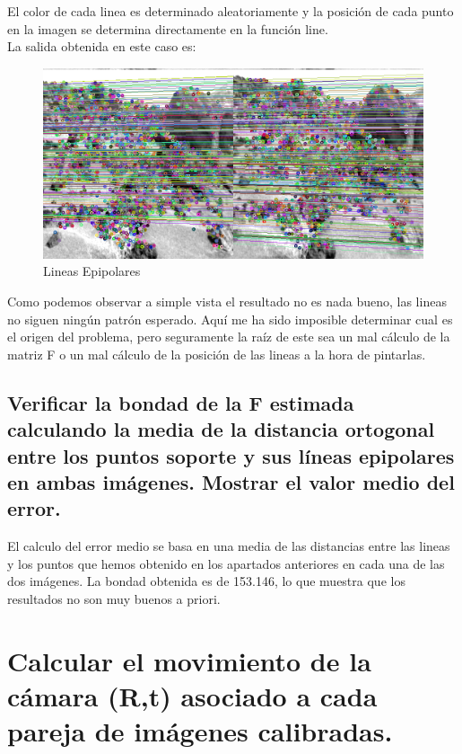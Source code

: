 El color de cada linea es determinado aleatoriamente y la posición de cada punto en la imagen se determina directamente en la función line.\\

La salida obtenida en este caso es:

\begin{figure}[H]
	\centering
	\includegraphics[width=0.9\linewidth]{Apartado-3C}
	\caption{Lineas Epipolares}
\end{figure}

Como podemos observar a simple vista el resultado no es nada bueno, las lineas no siguen ningún patrón esperado. Aquí me ha sido imposible determinar cual es el origen del problema, pero seguramente la raíz de este sea un mal cálculo de la matriz F o un mal cálculo de la posición de las lineas a la hora de pintarlas.


 
\subsection{Verificar la bondad de la F estimada calculando la media de la distancia ortogonal entre los puntos soporte y sus líneas epipolares en ambas imágenes. Mostrar el valor medio del error.}

El calculo del error medio se basa en una media de las distancias entre las lineas y los puntos que hemos obtenido en los apartados anteriores en cada una de las dos imágenes. La bondad obtenida es de 153.146, lo que muestra que los resultados no son muy buenos a priori.


\section{Calcular el movimiento de la cámara (R,t) asociado a cada pareja de imágenes calibradas.}

